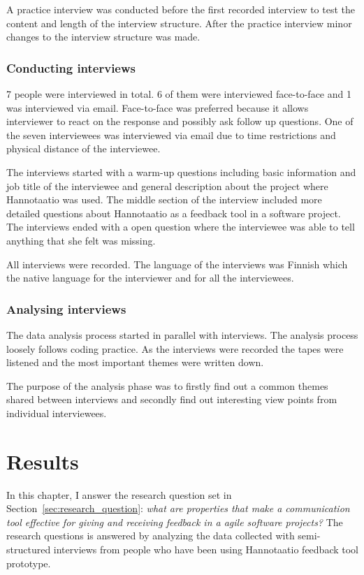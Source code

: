\documentclass[english,12pt,a4paper,pdftex]{article}
\begin{document}
A practice interview was conducted before the first recorded interview to test the content and length of the interview structure. After the practice interview minor changes to the interview structure was made.

\subsubsection{Conducting interviews}

7 people were interviewed in total. 6 of them were interviewed face-to-face and 1 was interviewed via email. Face-to-face was preferred because it allows interviewer to react on the response and possibly ask follow up questions. One of the seven interviewees was interviewed via email due to time restrictions and physical distance of the interviewee.

The interviews started with a warm-up questions including basic information and job title of the interviewee and general description about the project where Hannotaatio was used. The middle section of the interview included more detailed questions about Hannotaatio as a feedback tool in a software project. The interviews ended with a open question where the interviewee was able to tell anything that she felt was missing.

All interviews were recorded. The language of the interviews was Finnish which the native language for the interviewer and for all the interviewees.

\subsubsection{Analysing interviews}

The data analysis process started in parallel with interviews. The analysis process loosely follows coding practice. As the interviews were recorded the tapes were listened and the most important themes were written down. 

The purpose of the analysis phase was to firstly find out a common themes shared between interviews and secondly find out interesting view points from individual interviewees.

\clearpage

\section{Results}

In this chapter, I answer the research question set in Section~\ref{sec:research_question}: \textit{what are properties that make a communication tool effective for giving and receiving feedback in a agile software projects?} The research questions is answered by analyzing the data collected with semi-structured interviews from people who have been using Hannotaatio feedback tool prototype.
\end{document}
